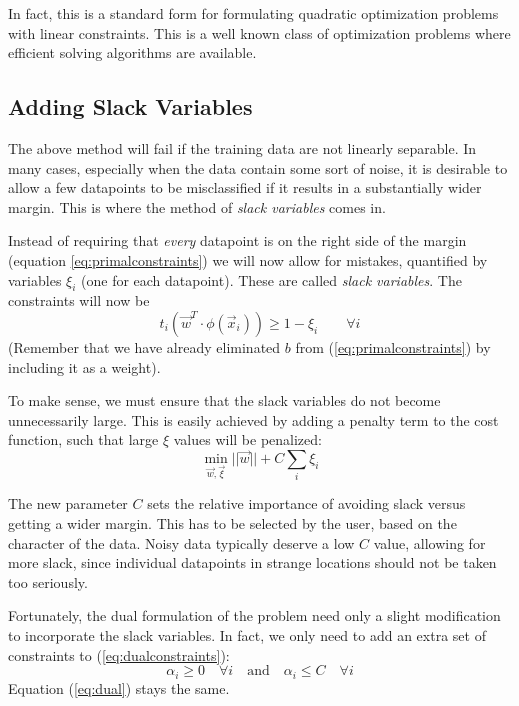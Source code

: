 \documentclass{article}
\begin{document}
In fact, this is a standard form for formulating quadratic
optimization problems with linear constraints.  This is a well known
class of optimization problems where efficient solving algorithms are
available.


\subsection{Adding Slack Variables}

The above method will fail if the training data are not linearly
separable.  In many cases, especially when the data contain some sort
of noise, it is desirable to allow a few datapoints to be
misclassified if it results in a substantially wider margin.  This is
where the method of \emph{slack variables} comes in.

Instead of requiring that \emph{every} datapoint is on the right side
of the margin (equation \ref{eq:primalconstraints}) we will now allow
for mistakes, quantified by variables \(\xi_i\) (one for each
datapoint).  These are called \emph{slack variables}.  The constraints
will now be
\begin{equation}\label{eq:slackprimalconstraints}
t_i(\vec{w}^T\cdot\phi(\vec{x}_i)) \ge 1 - \xi_i \qquad \forall i
\end{equation}
(Remember that we have already eliminated \(b\) from
(\ref{eq:primalconstraints}) by including it as a weight).

To make sense, we must ensure that the slack variables do not become
unnecessarily large.  This is easily achieved by adding a penalty term
to the cost function, such that large \(\xi\) values will be penalized:
\begin{equation}\label{eq:slackprimal}
  \min_{\vec{w}, \vec{\xi}} ||\vec{w}|| + C \sum_i \xi_i
\end{equation}

The new parameter \(C\) sets the relative importance of avoiding slack
versus getting a wider margin.  This has to be selected by the user,
based on the character of the data.  Noisy data typically deserve a
low \(C\) value, allowing for more slack, since individual datapoints
in strange locations should not be taken too seriously.

Fortunately, the dual formulation of the problem need only a slight
modification to incorporate the slack variables.  In fact, we only
need to add an extra set of constraints to (\ref{eq:dualconstraints}):
\begin{equation}\label{eq:slackdualconstraints}
  \alpha_i \ge 0 \quad \forall i \quad\textrm{and}\quad \alpha_i \le C \quad \forall i
\end{equation}
Equation (\ref{eq:dual}) stays the same.
\end{document}
